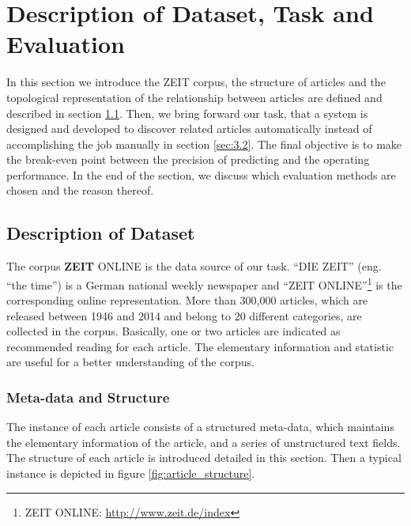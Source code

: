 \section{Description of Dataset, Task and Evaluation}
\label{sec:3}

In this section we introduce the ZEIT corpus, the structure of articles and the topological representation of the relationship between articles are defined and described in section \ref{sec:3.1}. Then, we bring forward our task, that a system is designed and developed to discover related articles automatically instead of accomplishing the job manually in section \ref{sec:3.2}. The final objective is to make the break-even point between the precision of predicting and the operating performance. In the end of the section, we discuss which evaluation methods are chosen and the reason thereof. 

\bigbreak
\subsection{Description of Dataset}
\label{sec:3.1}

The corpus \textbf{ZEIT} ONLINE is the data source of our task. ``DIE ZEIT'' (eng. ``the time'') is a German national weekly newspaper and ``ZEIT ONLINE''\footnote{ZEIT ONLINE: \url{http://www.zeit.de/index}} is the corresponding online representation. More than 300,000 articles, which are released between 1946 and 2014 and belong to 20 different categories, are collected in the corpus. Basically, one or two articles are indicated as recommended reading for each article. The elementary information and statistic are useful for a better understanding of the corpus. 

\subsubsection{Meta-data and Structure}
\label{sec:3structure}

The instance of each article consists of a structured meta-data, which maintains the elementary information of the article, and a series of unstructured text fields. The structure of each article is introduced detailed in this section. Then a typical instance is depicted in figure \ref{fig:article_structure}.



